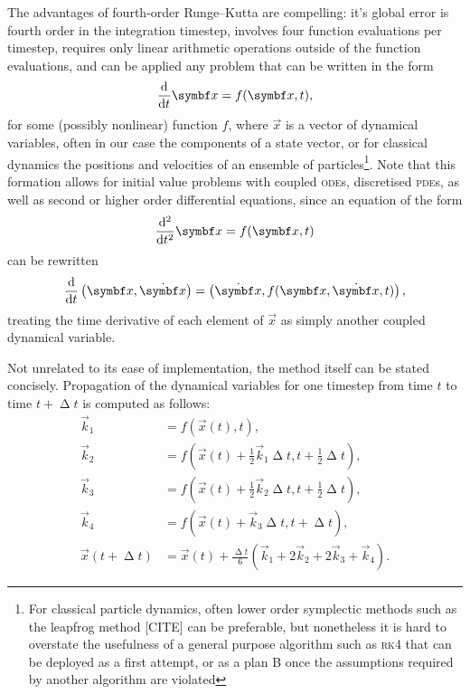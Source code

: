 The advantages of fourth-order Runge--Kutta are compelling: it's global error is fourth order in the integration timestep, involves four function evaluations per timestep, requires only linear arithmetic operations outside of the function evaluations, and can be applied any problem that can be written in the form
\begin{align}
\dv t \vec x = f(\vec x, t),
\end{align}
for some (possibly nonlinear) function $f$, where $\vec{x}$ is a vector of dynamical variables, often in our case the components of a state vector, or for classical dynamics the positions and velocities of an ensemble of particles\footnote{For classical particle dynamics, often lower order symplectic methods such as the leapfrog method [CITE] can be preferable, but nonetheless it is hard to overstate the usefulness of a general purpose algorithm such as \textsc{rk4} that can be deployed as a first attempt, or as a plan B once the assumptions required by another algorithm are violated}. Note that this formation allows for initial value problems with coupled \textsc{ode}s, discretised \textsc{pde}s, as well as second or higher order differential equations, since an equation of the form
\begin{align}
\dv[2] t \vec x = f(\vec x, t)
\end{align}
can be rewritten
\begin{align}
\dv t \left(\vec x, \dot{\vec x}\right) = \left(\dot{\vec x}, f(\vec x, \dot{\vec x}, t)\right),
\end{align}
treating the time derivative of each element of $\vec x$ as simply another coupled dynamical variable.

Not unrelated to its ease of implementation, the method itself can be stated concisely. Propagation of the dynamical variables for one timestep from time $t$ to time $t + \upDelta t$ is computed as follows:
\begin{align}
\vec k_1 &= f(\vec x(t), t),\nonumber\\
\vec k_2 &= f(\vec x(t) + \tfrac12 \vec k_1\upDelta t, t + \tfrac12\upDelta t),\nonumber\\
\vec k_3 &= f(\vec x(t) + \tfrac12 \vec k_2\upDelta t, t + \tfrac12\upDelta t),\nonumber\\
\vec k_4 &= f(\vec x(t) + \vec k_3\upDelta t, t + \upDelta t),\nonumber\\
\vec x(t + \upDelta t) &= \vec x(t)
+ \tfrac{\upDelta t}6(\vec k_1 + 2\vec k_2 + 2\vec k_3 + \vec k_4).\label{eq:rk4}
\end{align}


